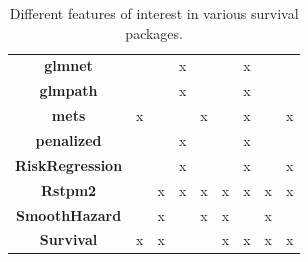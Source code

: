 \documentclass[
]{jss}
\begin{document}
\begin{table}[ht]
{\begin{tabular}{ccccccccc}
\textbf{glmnet} \cite{regpathcox}         &                          &                           & x                     &                  &                     & x                        &                                  &                                  \\
\textbf{glmpath} \cite{park_hastie}       &                          &                           & x                     &                  &                     & x                        &                                  &                                  \\
\textbf{mets} \cite{scheike2014estimating}           & x                        &                           &                       & x                &                     & x                        &                                  & x                                \\
\textbf{penalized} \cite{goeman_meijer2019}      &                          &                           & x                     &                  &                     & x                        &                                  &                                  \\
\textbf{RiskRegression} \cite{gerds_blanche} &                          &                           & x                     &                  &                     & x                        &                                  & x                                \\
\textbf{Rstpm2} \cite{clements_liu}         &                          & x                         & x                     & x                & x                   & x                        & x                                & x                         \\
\textbf{SmoothHazard} \cite{smoothHazard}   &                          & x                         &                       & x                & x                   &                          & x                            &                                      \\
\textbf{Survival} \cite{survival-package}       & x                        & x                         &                       &                  & x                   & x                        & x                                & x                               
\end{tabular}%
}
\caption{Different features of interest in various survival packages.}
\label{tab:surv-pkgs}
\end{table}
\end{document}
